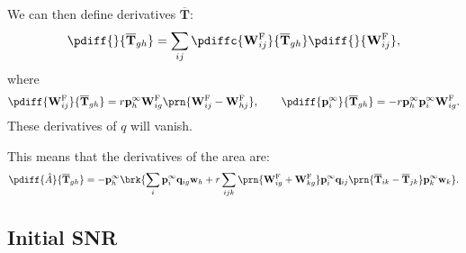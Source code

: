 \documentclass[12pt]{article}
\newcommand{\eq}{\mathbf{p}^\infty}
\newcommand{\fpt}{\mathbf{T}}
\newcommand{\fptb}{\overline{\fpt}}
\newcommand{\w}{\mathbf{w}}
\newcommand{\W}{\mathbf{W}}
\newcommand{\enc}{\mathbf{q}}
\newcommand{\frg}{\W^{\mathrm{F}}}
\begin{document}
We can then define derivatives \wrt $\fptb$:
%
\begin{equation}\label{eq:derivTdef}
  \pdiff{}{\fptb_{gh}} = \sum_{ij} \pdiffc{\frg_{ij}}{\fptb_{gh}} \pdiff{}{\frg_{ij}},
\end{equation}
%
where
%
\begin{equation}\label{eq:derivTWp}
  \pdiff{\frg_{ij}}{\fptb_{gh}} = r \eq_h \frg_{ig} \prn{\frg_{ij}-\frg_{hj}} ,
  \qquad
  \pdiff{\eq_{i}}{\fptb_{gh}} = -r \eq_h \eq_i \frg_{ig} .
\end{equation}
%
These derivatives of $q$ will vanish.

This means that the derivatives of the area are:
%
\begin{equation}\label{eq:derivTarea}
  \pdiff{\hat{A}}{\fptb_{gh}} = -\eq_h\brk{
    \sum_i \eq_i \enc_{ig} \w_h
    + r\sum_{ijk} \prn{\frg_{ig}+\frg_{kg}} \eq_i \enc_{ij} \prn{\fptb_{ik}-\fptb_{jk}} \eq_k \w_k
    }.
\end{equation}
%



\subsection{Initial SNR}\label{sec:initSNR}
\end{document}
